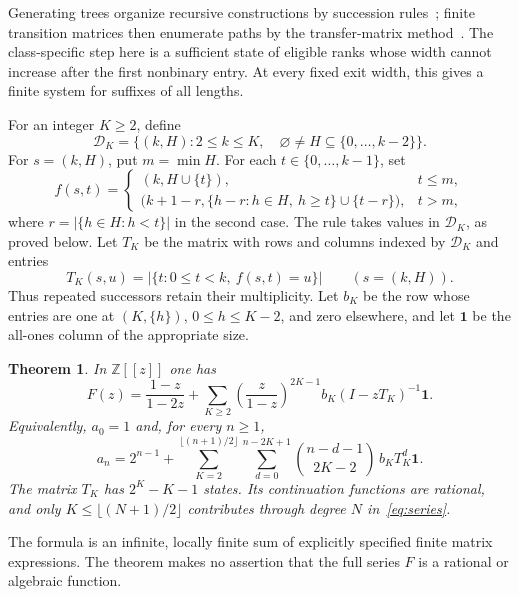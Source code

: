 \documentclass[11pt]{article}
\newtheorem{theorem}{Theorem}
\theoremstyle{remark}
\newcommand{\D}{\mathcal D}
\newcommand{\one}{\mathbf 1}
\begin{document}
Generating trees organize recursive constructions by succession
rules~\cite{Banderier2002}; finite transition matrices then enumerate
paths by the transfer-matrix method~\cite[Section~4.7]{Stanley2012}.
The class-specific step here is a sufficient state of eligible ranks
whose width cannot increase after the first nonbinary entry. At every
fixed exit width, this gives a finite system for suffixes of all lengths.

For an integer $K\geq2$, define
\[
 \D_K=\{(k,H):2\leq k\leq K,\quad
       \varnothing\ne H\subseteq\{0,\ldots,k-2\}\}.
\]
For $s=(k,H)$, put $m=\min H$. For each $t\in\{0,\ldots,k-1\}$, set
\begin{equation}\label{eq:transition}
 f(s,t)=
 \begin{cases}
 (k,H\cup\{t\}),&t\leq m,\\[2pt]
 \bigl(k+1-r,\{h-r:h\in H,\ h\geq t\}\cup\{t-r\}\bigr),&t>m,
 \end{cases}
\end{equation}
where $r=|\{h\in H:h<t\}|$ in the second case.
The rule takes values in $\D_K$, as proved below. Let $T_K$ be the
matrix with rows and columns indexed by $\D_K$ and entries
\[
 T_K(s,u)=|\{t:0\leq t<k,\ f(s,t)=u\}| \qquad(s=(k,H)).
\]
Thus repeated successors retain their multiplicity. Let $b_K$ be the row
whose entries are one at $(K,\{h\})$, $0\leq h\leq K-2$, and zero
elsewhere, and let $\one$ be the all-ones column of the appropriate size.

\begin{theorem}\label{thm:main}
In $\mathbb Z[[z]]$ one has
\begin{equation}\label{eq:series}
 F(z)=\frac{1-z}{1-2z}
   +\sum_{K\geq2}\left(\frac{z}{1-z}\right)^{2K-1}
      b_K(I-zT_K)^{-1}\one.
\end{equation}
Equivalently, $a_0=1$ and, for every $n\geq1$,
\begin{equation}\label{eq:coefficients}
 a_n=2^{n-1}+
 \sum_{K=2}^{\lfloor(n+1)/2\rfloor}
 \sum_{d=0}^{n-2K+1}
 \binom{n-d-1}{2K-2}\,b_KT_K^d\one.
\end{equation}
The matrix $T_K$ has $2^K-K-1$ states. Its continuation functions are
rational, and only $K\leq\lfloor(N+1)/2\rfloor$ contributes through
degree $N$ in~\eqref{eq:series}.
\end{theorem}

The formula is an infinite, locally finite sum of explicitly specified
finite matrix expressions. The theorem makes no assertion that the full
series $F$ is a rational or algebraic function.
\end{document}
